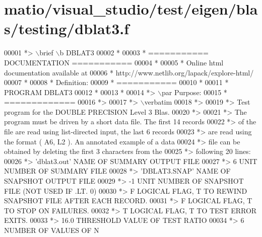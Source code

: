 \hypertarget{matio_2visual__studio_2test_2eigen_2blas_2testing_2dblat3_8f_source}{}\section{matio/visual\+\_\+studio/test/eigen/blas/testing/dblat3.f}
\label{matio_2visual__studio_2test_2eigen_2blas_2testing_2dblat3_8f_source}

\begin{DoxyCode}
00001 \textcolor{comment}{*> \(\backslash\)brief \(\backslash\)b DBLAT3}
00002 \textcolor{comment}{*}
00003 \textcolor{comment}{*  =========== DOCUMENTATION ===========}
00004 \textcolor{comment}{*}
00005 \textcolor{comment}{* Online html documentation available at }
00006 \textcolor{comment}{*            http://www.netlib.org/lapack/explore-html/ }
00007 \textcolor{comment}{*}
00008 \textcolor{comment}{*  Definition:}
00009 \textcolor{comment}{*  ===========}
00010 \textcolor{comment}{*}
00011 \textcolor{comment}{*       PROGRAM DBLAT3}
00012 \textcolor{comment}{* }
00013 \textcolor{comment}{*}
00014 \textcolor{comment}{*> \(\backslash\)par Purpose:}
00015 \textcolor{comment}{*  =============}
00016 \textcolor{comment}{*>}
00017 \textcolor{comment}{*> \(\backslash\)verbatim}
00018 \textcolor{comment}{*>}
00019 \textcolor{comment}{*> Test program for the DOUBLE PRECISION Level 3 Blas.}
00020 \textcolor{comment}{*>}
00021 \textcolor{comment}{*> The program must be driven by a short data file. The first 14 records}
00022 \textcolor{comment}{*> of the file are read using list-directed input, the last 6 records}
00023 \textcolor{comment}{*> are read using the format ( A6, L2 ). An annotated example of a data}
00024 \textcolor{comment}{*> file can be obtained by deleting the first 3 characters from the}
00025 \textcolor{comment}{*> following 20 lines:}
00026 \textcolor{comment}{*> 'dblat3.out'      NAME OF SUMMARY OUTPUT FILE}
00027 \textcolor{comment}{*> 6                 UNIT NUMBER OF SUMMARY FILE}
00028 \textcolor{comment}{*> 'DBLAT3.SNAP'     NAME OF SNAPSHOT OUTPUT FILE}
00029 \textcolor{comment}{*> -1                UNIT NUMBER OF SNAPSHOT FILE (NOT USED IF .LT. 0)}
00030 \textcolor{comment}{*> F        LOGICAL FLAG, T TO REWIND SNAPSHOT FILE AFTER EACH RECORD.}
00031 \textcolor{comment}{*> F        LOGICAL FLAG, T TO STOP ON FAILURES.}
00032 \textcolor{comment}{*> T        LOGICAL FLAG, T TO TEST ERROR EXITS.}
00033 \textcolor{comment}{*> 16.0     THRESHOLD VALUE OF TEST RATIO}
00034 \textcolor{comment}{*> 6                 NUMBER OF VALUES OF N}

\end{DoxyCode}
